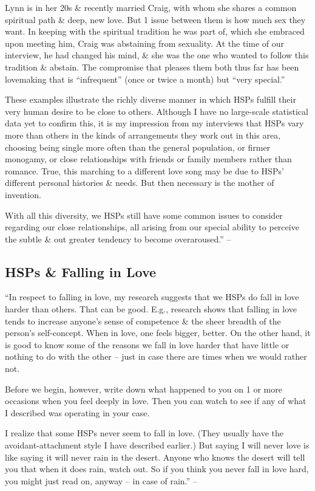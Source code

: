 \documentclass{article}
\numberwithin{equation}{section}
\begin{document}
Lynn is in her 20s \& recently married Craig, with whom she shares a common spiritual path \& deep, new love. But 1 issue between them is how much sex they want. In keeping with the spiritual tradition he was part of, which she embraced upon meeting him, Craig was abstaining from sexuality. At the time of our interview, he had changed his mind, \& she was the one who wanted to follow this tradition \& abstain. The compromise that pleases them both thus far has been lovemaking that is ``infrequent'' (once or twice a month) but ``very special.''

These examples illustrate the richly diverse manner in which HSPs fulfill their very human desire to be close to others. Although I have no large-scale statistical data yet to confirm this, it is my impression from my interviews that HSPs vary more than others in the kinds of arrangements they work out in this area, choosing being single more often than the general population, or firmer monogamy, or close relationships with friends or family members rather than romance. True, this marching to a different love song may be due to HSPs' different personal histories \& needs. But then necessary is the mother of invention.

With all this diversity, we HSPs still have some common issues to consider regarding our close relationships, all arising from our special ability to perceive the subtle \& out greater tendency to become overaroused.'' -- \cite[pp. 169--171]{Aron2013}

\subsection{HSPs \& Falling in Love}
``In respect to falling in love, my research suggests that we HSPs do fall in love harder than others. That can be good. E.g., research shows that falling in love tends to increase anyone's sense of competence \& the sheer breadth of the person's self-concept. When in love, one feels bigger, better. On the other hand, it is good to know some of the reasons we fall in love harder that have little or nothing to do with the other -- just in case there are times when we would rather not.

Before we begin, however, write down what happened to you on 1 or more occasions when you feel deeply in love. Then you can watch to see if any of what I described was operating in your case.

I realize that some HSPs never seem to fall in love. (They usually have the avoidant-attachment style I have described earlier.) But saying I will never love is like saying it will never rain in the desert. Anyone who knows the desert will tell you that when it does rain, watch out. So if you think you never fall in love hard, you might just read on, anyway -- in case of rain.'' -- \cite[pp. 171--172]{Aron2013}
\end{document}
